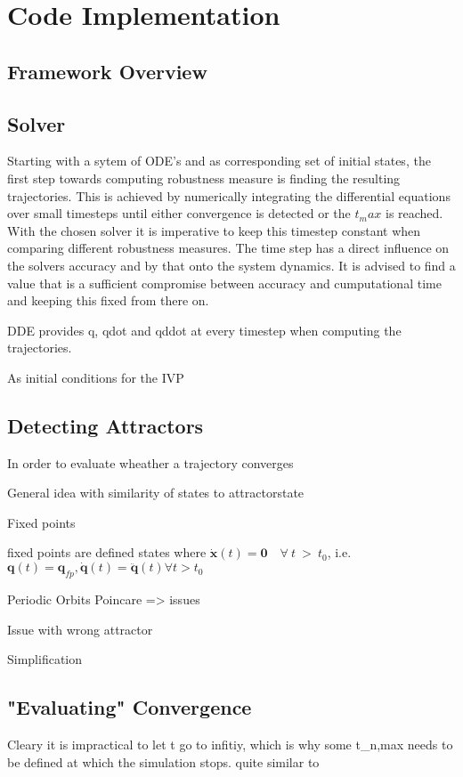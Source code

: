 \section{Code Implementation}

\subsection{Framework Overview}



\subsection{Solver}

Starting with a sytem of ODE's and as corresponding set of initial states, the first step towards computing robustness measure is finding the resulting trajectories. This is achieved by numerically integrating the differential equations over small timesteps until either convergence is detected or the $t_max$ is reached. With the chosen solver it is imperative to keep this timestep constant when comparing different robustness measures. The time step has a direct influence on the solvers accuracy and by that onto the system dynamics. It is advised to find a value that is a sufficient compromise between accuracy and cumputational time and keeping this fixed from there on.

DDE provides q, qdot and qddot at every timestep when computing the trajectories. 

As initial conditions for the IVP  
\subsection{Detecting Attractors}

In order to evaluate wheather a trajectory converges 
    
    General idea with similarity of states to attractorstate

    Fixed points

    fixed points are defined states where $\dot{\mathbf{x}}(t) = \mathbf{0} \quad \forall \ t\  >\  t_0 $, i.e. $\mathbf{q}(t)=\mathbf{q}_{fp}, \dot{\mathbf{q}}(t) = \ddot{\mathbf{q}}(t)  \forall t > t_0$

    Periodic Orbits
        Poincare => issues

    Issue with wrong attractor

    Simplification


\subsection{"Evaluating" Convergence}
Cleary it is impractical to let t go to infitiy, which is why some t_n,max needs to be defined at which the simulation stops. 
    quite similar to 

